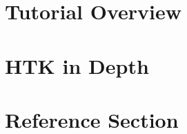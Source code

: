 \documentclass[a4paper,oneside]{book}
\begin{document}
\part{Tutorial Overview}




\part{HTK in Depth}











\part{Reference Section}
























   
\clearpage
{}
\printindex
\end{document}

